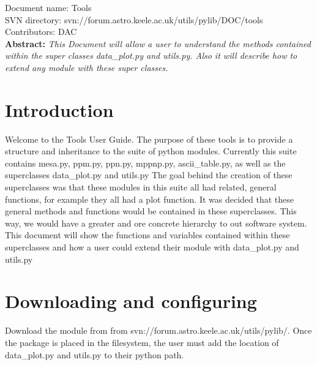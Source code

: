 \renewcommand{\ndoctitle}{data_plot.py and utils.py: A guide to using these superclasses} 
\renewcommand{\ndocname}{Tools}                      
\renewcommand{\svndir}{svn://forum.astro.keele.ac.uk/utils/pylib/DOC/tools}  
\renewcommand{\ndoccontribs}{DAC}



Document name: \ndocname \\
SVN directory: \svndir\\
Contributors: \ndoccontribs\\



{\textbf{Abstract:} \slshape
This Document will allow a user to understand the methods contained within the super classes
data\_plot.py and utils.py.  Also it will describe how to extend any module with 
these super classes.
}

\section{Introduction}
Welcome to the Tools User Guide.  The purpose of these tools is to provide a structure and inheritance to 
the suite of python modules. Currently this suite contains mesa.py, ppm.py, ppn.py, mppnp.py, ascii\_table.py, as well as the superclasses data\_plot.py and utils.py
The goal behind the creation of these superclasses was that these modules in this suite all had related, general functions, for example they all had a plot function.
It was decided that these general methods and functions would be contained in these superclasses.
This way, we would have a greater and ore concrete hierarchy to out software system.
This document will show the functions and variables contained within these superclasses and how a user could extend their module with data\_plot.py and utils.py

\section{Downloading and configuring}
Download the module from from svn://forum.astro.keele.ac.uk/utils/pylib/.   Once the package is placed in the filesystem, the user must add the location
of data\_plot.py and utils.py to their python path.

